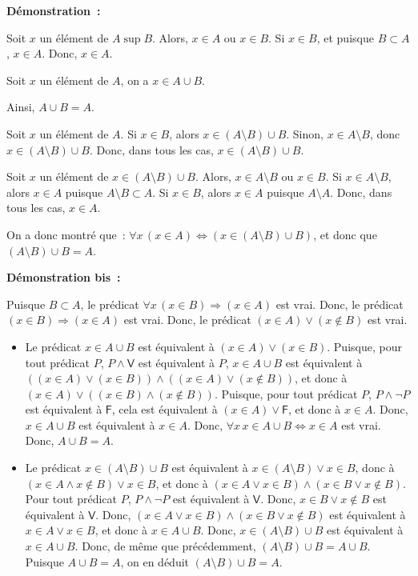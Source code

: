 \medskip

\noindent\textbf{Démonstration :}
    
    Soit $x$ un élément de $A \sup B$. 
    Alors, $x \in A$ ou $x \in B$.
    Si $x \in B$, et puisque $B \subset A$, $x \in A$.
    Donc, $x \in A$.

    Soit $x$ un élément de $A$, on a $x \in A \cup B$.

    Ainsi, $A \cup B = A$.

    Soit $x$ un élément de $A$. 
    Si $x \in B$, alors $x \in (A \setminus B) \cup B$.
    Sinon, $x \in A \setminus B$, donc $x \in (A \setminus B) \cup B$.
    Donc, dans tous les cas, $x \in (A \setminus B) \cup B$.

    Soit $x$ un élément de $x \in (A \setminus B) \cup B$.
    Alors, $x \in A \setminus B$ ou $x \in B$. 
    Si $ x \in A \setminus B$, alors $x \in A$ puisque $A \setminus B \subset A$.
    Si $ x \in B$, alors $x \in A$ puisque $A \setminus A$.
    Donc, dans tous les cas, $x \in A$.

    On a donc montré que : $\forall x \, (x \in A) \Leftrightarrow (x \in (A \setminus B) \cup B)$, et donc que $(A \setminus B) \cup B = A$.

    \done

\medskip

\noindent\textbf{Démonstration bis :} 

Puisque $B \subset A$, le prédicat $\forall x \, (x \in B) \Rightarrow (x \in A)$ est vrai.
Donc, le prédicat $(x \in B) \Rightarrow (x \in A)$ est vrai.
Donc, le prédicat $(x \in A) \vee (x \notin B)$ est vrai.

\begin{itemize}[nosep]
    \item Le prédicat $x \in A \cup B$ est équivalent à $(x \in A) \vee (x \in B)$.
        Puisque, pour tout prédicat $P$, $P \wedge \mathsf{V}$ est équivalent à $P$, $x \in A \cup B$ est équivalent à $((x \in A) \vee (x \in B)) \wedge ((x \in A) \vee (x \notin B))$, et donc à $(x \in A) \vee ((x \in B) \wedge (x \notin B))$.
        Puisque, pour tout prédicat $P$, $P \wedge \neg P$ est équivalent à $\mathsf{F}$, cela est équivalent à $(x \in A) \vee \mathsf{F}$, et donc à $x \in A$.
        Donc, $x \in A \cup B$ est équivalent à $x \in A$.
        Donc, $\forall x \, x \in A \cup B \Leftrightarrow x \in A$ est vrai.
        Donc, $A \cup B = A$.
    \item Le prédicat $x \in (A \setminus B) \cup B$ est équivalent à $x \in (A \setminus B) \vee x \in B$, donc à $(x \in A \wedge x \notin B) \vee x \in B$, et donc à $(x \in A \vee x \in B) \wedge (x \in B \vee x \notin B)$.
        Pour tout prédicat $P$, $P \wedge \neg P$ est équivalent à $\mathsf{V}$.
        Donc, $x \in B \vee x \notin B$ est équivalent à $\mathsf{V}$.
        Donc, $(x \in A \vee x \in B) \wedge (x \in B \vee x \notin B)$ est équivalent à $x \in A \vee x \in B$, et donc à $x \in A \cup B$.
        Donc, $x \in (A \setminus B) \cup B$ est équivalent à $x \in A \cup B$.
        Donc, de même que précédemment, $(A \setminus B) \cup B = A \cup B$.
        Puisque $A \cup B = A$, on en déduit $(A \setminus B) \cup B = A$.
\end{itemize}

